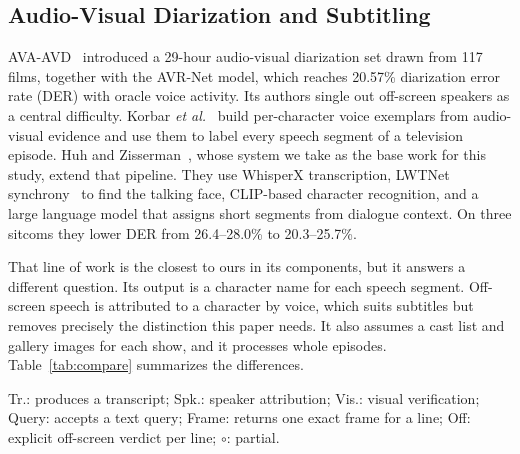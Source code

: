 \documentclass[conference]{IEEEtran}
\begin{document}
\subsection{Audio-Visual Diarization and Subtitling}
AVA-AVD~\cite{xu2022avaavd} introduced a 29-hour audio-visual diarization set drawn from 117 films, together with the AVR-Net model, which reaches 20.57\% diarization error rate (DER) with oracle voice activity. Its authors single out off-screen speakers as a central difficulty. Korbar \textit{et al.}~\cite{korbar2024llr} build per-character voice exemplars from audio-visual evidence and use them to label every speech segment of a television episode. Huh and Zisserman~\cite{huh2024context}, whose system we take as the base work for this study, extend that pipeline. They use WhisperX transcription, LWTNet synchrony~\cite{afouras2020lwtnet} to find the talking face, CLIP-based character recognition, and a large language model that assigns short segments from dialogue context. On three sitcoms they lower DER from 26.4--28.0\% to 20.3--25.7\%.

That line of work is the closest to ours in its components, but it answers a different question. Its output is a character name for each speech segment. Off-screen speech is attributed to a character by voice, which suits subtitles but removes precisely the distinction this paper needs. It also assumes a cast list and gallery images for each show, and it processes whole episodes. Table~\ref{tab:compare} summarizes the differences.

\begin{table}[t]
\centering
\caption{Capabilities of related systems and of the proposed pipeline}
\label{tab:compare}

\vspace{3pt}
\parbox{\columnwidth}{\scriptsize Tr.: produces a transcript; Spk.: speaker attribution; Vis.: visual verification; Query: accepts a text query; Frame: returns one exact frame for a line; Off: explicit off-screen verdict per line; $\circ$: partial.}
\end{table}
\end{document}
